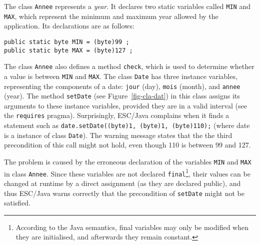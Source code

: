 \documentclass[a4paper]{llncs}
\begin{document}
The class \texttt{Annee} represents a \textit{year}. It 
declares two
static variables called \texttt{MIN} and \texttt{MAX}, which represent
the minimum and maximum year allowed by the application.
Its declarations are as follows:
\begin{verbatim}
public static byte MIN = (byte)99 ;
public static byte MAX = (byte)127 ;
\end{verbatim}

The class \texttt{Annee} also defines a method \texttt{check}, which is
used to determine whether a value is between \texttt{MIN} and \texttt{MAX}. The
class \texttt{Date} has three instance variables, representing the
components of a date: \texttt{jour} (day),
\texttt{mois} (month), and \texttt{annee} (year). The method
\texttt{setDate} (see Figure~\ref{fig-cla-dat})
in this class assigns its arguments to these
instance variables, provided they are in a valid interval (see the
\texttt{requires} pragma). %
Surprisingly, ESC/Java complains when it
finds a statement such as
\mbox{\tt date.setDate((byte)1, (byte)1, (byte)110);} (where date is a
instance of class \texttt{Date}). The warning message states that the
the third precondition of this call might not hold, even though 110 is 
between 99 and 127.

The problem is caused by the erroneous declaration of the variables 
\texttt{MIN} and \texttt{MAX} in class \texttt{Annee}.
Since these variables are not declared 
\texttt{final}\footnote{According to the Java semantics, final
variables may only be modified when they are initialised, and
afterwards they remain constant.}, their values can be changed at
runtime by a direct assignment (as they are declared public), and thus
ESC/Java warns correctly that the precondition of \texttt{setDate}
might not be satisfied.
\end{document}

